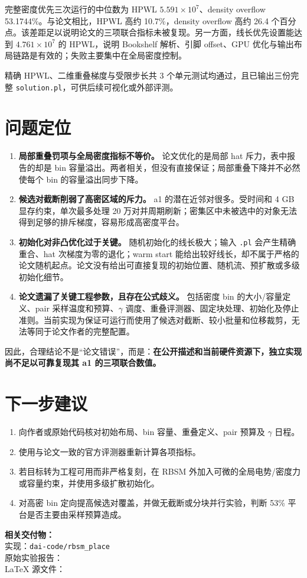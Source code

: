 \documentclass[11pt,a4paper]{ctexart}
\newcommand{\RBSM}{\textsc{RBSM}}
\newcommand{\HPWL}{\textsc{HPWL}}
\begin{document}
完整密度优先三次运行的中位数为 \HPWL{} $5.591\times10^7$、density overflow 53.1744\%。与论文相比，\HPWL{} 高约 10.7\%，density overflow 高约 26.4 个百分点。该差距足以说明论文的三项联合指标未被复现。另一方面，线长优先设置能达到 $4.761\times10^7$ 的 \HPWL{}，说明 Bookshelf 解析、引脚 offset、GPU 优化与输出布局链路是有效的；失败主要集中在全局密度控制。

精确 \HPWL{}、二维重叠梯度与受限步长共 3 个单元测试均通过，且已输出三份完整 \texttt{solution.pl}，可供后续可视化或外部评测。

\section{问题定位}

\begin{enumerate}
  \item \textbf{局部重叠罚项与全局密度指标不等价。} 论文优化的是局部 hat 斥力，表中报告的却是 bin 容量溢出。两者相关，但没有直接保证；局部重叠下降并不必然使每个 bin 的容量溢出同步下降。
  \item \textbf{候选对截断削弱了高密区域的斥力。} a1 的潜在近邻对很多。受时间和 4 GB 显存约束，单次最多处理 20 万对并周期刷新；密集区中未被选中的对象无法得到足够的排斥梯度，容易形成高密度平台。
  \item \textbf{初始化对非凸优化过于关键。} 随机初始化的线长极大；输入 \texttt{.pl} 会产生精确重合、hat 次梯度为零的退化；warm start 能给出较好线长，却不属于严格的论文随机起点。论文没有给出可直接复现的初始位置、随机流、预扩散或多级初始化细节。
  \item \textbf{论文遗漏了关键工程参数，且存在公式歧义。} 包括密度 bin 的大小/容量定义、pair 采样温度和预算、$\gamma$ 调度、重叠评测器、固定块处理、初始化及停止准则。当前实现为保证可运行而使用了候选对截断、较小批量和位移裁剪，无法等同于论文作者的完整配置。
\end{enumerate}

因此，合理结论不是“论文错误”，而是：\textbf{在公开描述和当前硬件资源下，独立实现尚不足以可靠复现其 a1 的三项联合数值。}

\section{下一步建议}
\begin{enumerate}
  \item 向作者或原始代码核对初始布局、bin 容量、重叠定义、pair 预算及 $\gamma$ 日程。
  \item 使用与论文一致的官方评测器重新计算各项指标。
  \item 若目标转为工程可用而非严格复刻，在 \RBSM{} 外加入可微的全局电势/密度力或容量约束，并使用多级扩散初始化。
  \item 对高密 bin 定向提高候选对覆盖，并做无截断或分块并行实验，判断 53\% 平台是否主要由采样预算造成。
\end{enumerate}

\noindent\textbf{相关交付物：}\\
实现：\texttt{dai-code/rbsm\_place}\\
原始实验报告：\\
LaTeX 源文件：
\end{document}
